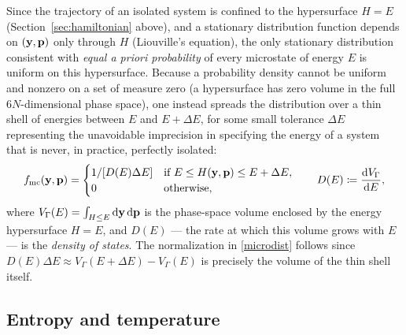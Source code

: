Since the trajectory of an isolated system is confined to the hypersurface $H=E$ (Section~\ref{sec:hamiltonian} above), and a stationary distribution function depends on $(\mathbf{y},\mathbf{p})$ only through $H$ (Liouville's equation), the only stationary distribution consistent with \textit{equal a priori probability} of every microstate of energy $E$ is uniform on this hypersurface. Because a probability density cannot be uniform and nonzero on a set of measure zero (a hypersurface has zero volume in the full $6N$-dimensional phase space), one instead spreads the distribution over a thin shell of energies between $E$ and $E+\Delta E$, for some small tolerance $\Delta E$ representing the unavoidable imprecision in specifying the energy of a system that is never, in practice, perfectly isolated:
\begin{equation}\label{microdist}
	f_{\rm mc}(\mathbf{y},\mathbf{p}) = \begin{cases} 1/[D(E)\Delta E] & \text{if } E\leq H(\mathbf{y},\mathbf{p}) \leq E+\Delta E, \\ 0 & \text{otherwise,}\end{cases} \qquad D(E)\coloneqq\frac{\mathrm{d} V_\Gamma}{\mathrm{d} E},
\end{equation}
where $V_\Gamma(E)=\int_{H\leq E}\mathrm{d}\mathbf{y}\,\mathrm{d}\mathbf{p}$ is the phase-space volume enclosed by the energy hypersurface $H=E$, and $D(E)$ --- the rate at which this volume grows with $E$ --- is the \textit{density of states}. The normalization in \eqref{microdist} follows since $D(E)\Delta E \approx V_\Gamma(E+\Delta E)-V_\Gamma(E)$ is precisely the volume of the thin shell itself.

\subsection*{Entropy and temperature}

